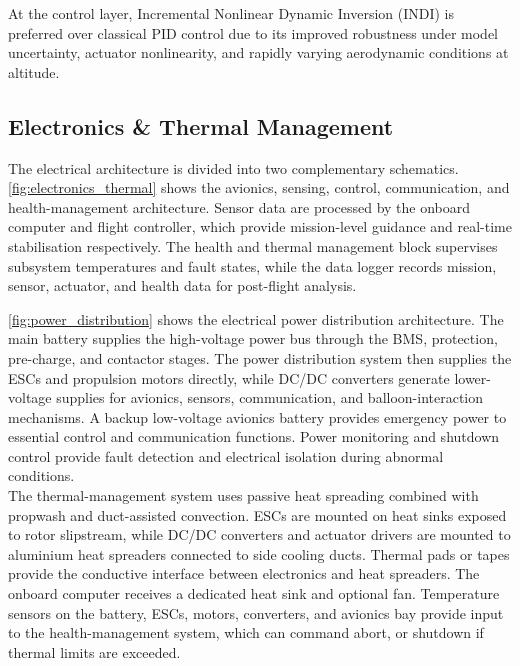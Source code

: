 At the control layer, Incremental Nonlinear Dynamic Inversion (INDI) is preferred over classical PID control due to its improved robustness under model uncertainty, actuator nonlinearity, and rapidly varying aerodynamic conditions at altitude.



\subsection{Electronics \& Thermal Management}
The electrical architecture is divided into two complementary schematics. 
\autoref{fig:electronics_thermal} shows the avionics, sensing, control, communication, and health-management architecture. 
Sensor data are processed by the onboard computer and flight controller, which provide mission-level guidance and real-time stabilisation respectively. 
The health and thermal management block supervises subsystem temperatures and fault states, while the data logger records mission, sensor, actuator, and health data for post-flight analysis.

\autoref{fig:power_distribution} shows the electrical power distribution architecture. 
The main battery supplies the high-voltage power bus through the BMS, protection, pre-charge, and contactor stages. 
The power distribution system then supplies the ESCs and propulsion motors directly, while DC/DC converters generate lower-voltage supplies for avionics, sensors, communication, and balloon-interaction mechanisms. 
A backup low-voltage avionics battery provides emergency power to essential control and communication functions. 
Power monitoring and shutdown control provide fault detection and electrical isolation during abnormal conditions.\\
The thermal-management system uses passive heat spreading combined with propwash and duct-assisted convection. ESCs are mounted on heat sinks exposed to rotor slipstream, while DC/DC converters and actuator drivers are mounted to aluminium heat spreaders connected to side cooling ducts. Thermal pads or tapes provide the conductive interface between electronics and heat spreaders. The onboard computer receives a dedicated heat sink and optional fan. Temperature sensors on the battery, ESCs, motors, converters, and avionics bay provide input to the health-management system, which can command abort, or shutdown if thermal limits are exceeded.

